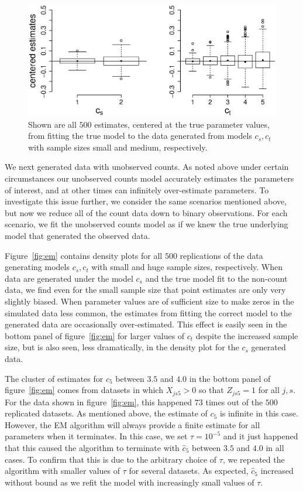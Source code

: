 \begin{figure}
  \centering
  \includegraphics[scale=0.5]{bp}
  \caption{Shown are all $500$ estimates, centered at the true parameter values, from fitting the true model to the data generated from models $c_s,c_t$ with sample sizes small and medium, respectively.}
  \label{fig:bp}
\end{figure}

We next generated data with unobserved counts.  As noted above under certain circumstances our unobserved counts model accurately estimates the parameters of interest, and at other times can infinitely over-estimate parameters.  To investigate this issue further, we consider the same scenarios mentioned above, but now we reduce all of the count data down to binary observations.  For each scenario, we fit the unobserved counts model as if we knew the true underlying model that generated the observed data.

Figure~\ref{fig:em} contains density plots for all $500$ replications of the data generating models $c_s,c_t$ with small and huge sample sizes, respectively.  When data are generated under the model $c_s$ and the true model fit to the non-count data, we find even for the small sample size that point estimates are only very slightly biased.  When parameter values are of sufficient size to make zeros in the simulated data less common, the estimates from fitting the correct model to the generated data are occasionally over-estimated.  This effect is easily seen in the bottom panel of figure~\ref{fig:em} for larger values of $c_t$ despite the increased sample size, but is also seen, less dramatically, in the density plot for the $c_s$ generated data.  

The cluster of estimates for $c_5$ between $3.5$ and $4.0$ in the bottom panel of figure~\ref{fig:em} comes from datasets in which $X_{js5}>0$ so that $Z_{js5}=1$ for all $j,s$.  For the data shown in figure~\ref{fig:em}, this happened $73$ times out of the $500$ replicated datasets.  As mentioned above, the estimate of $c_5$ is infinite in this case. However, the EM algorithm will always provide a finite estimate for all parameters when it terminates.  In this case, we set $\tau=10^{-5}$ and it just happened that this caused the algorithm to terminate with $\hat c_5$ between $3.5$ and $4.0$ in all cases.  To confirm that this is due to the arbitrary choice of $\tau$, we repeated the algorithm with smaller values of $\tau$ for several datasets. As expected, $\hat c_5$ increased without bound as we refit the model with increasingly small values of $\tau$.

